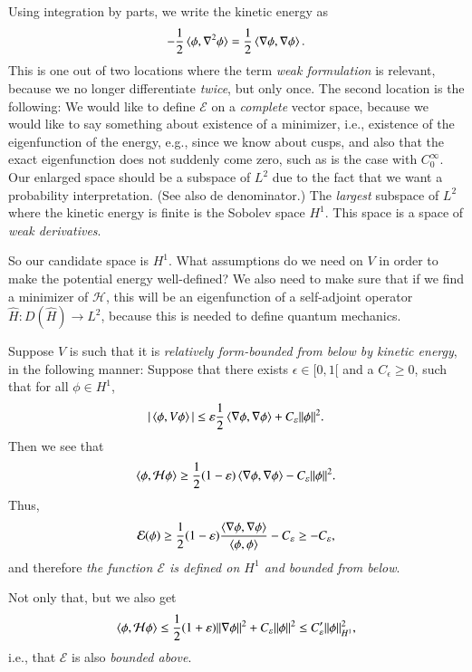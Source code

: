 Using integration by parts, we write the kinetic energy as
\begin{equation}
    -\frac{1}{2}\braket{\phi,\nabla^2\phi} = \frac{1}{2} \braket{\nabla\phi,\nabla\phi}.
\end{equation}
This is one out of two locations where the term \emph{weak formulation} is relevant, because we no longer differentiate \emph{twice}, but only once. The second location is the following: We would like to define $\mathcal{E}$ on a \emph{complete} vector space, because we would like to say something about existence of a minimizer, i.e., existence of the eigenfunction of the energy, e.g., since we know about cusps, and also that the exact eigenfunction does not suddenly come zero, such as is the case with $C^\infty_0$. Our enlarged space should be a subspace of $L^2$ due to the fact that we want a probability interpretation. (See also de denominator.) The \emph{largest} subspace of $L^2$ where the kinetic energy is finite is the Sobolev space $H^1$. This space is a space of \emph{weak derivatives}.

So our candidate space is $H^1$. What assumptions do we need on $V$ in order to make the potential energy well-defined? We also need to make sure that if we find a minimizer of $\mathcal{H}$, this will be an eigenfunction of a self-adjoint operator $\hat{H} : D(\hat{H}) \to L^2$, because this is needed to define quantum mechanics.

Suppose $V$ is such that it is \emph{relatively form-bounded from below by kinetic energy}, in the following manner: Suppose that there exists $\epsilon  \in[0,1[$ and a $C_\epsilon \geq 0$, such that for all $\phi\in H^1$,
\begin{equation} \label{eq:form-bounded}
    |\braket{\phi,V\phi}| \leq \varepsilon \frac{1}{2}\braket{\nabla\phi,\nabla\phi} + C_\varepsilon \|\phi\|^2.
\end{equation}
Then we see that
\begin{equation}
    \braket{\phi,\mathcal{H}\phi} \geq \frac{1}{2}(1-\varepsilon) \braket{\nabla\phi,\nabla\phi} - C_\varepsilon \|\phi\|^2.
\end{equation}
Thus,
\begin{equation}
    \mathcal{E}(\phi) \geq \frac{1}{2}(1-\varepsilon) \frac{\braket{\nabla\phi,\nabla\phi}}{\braket{\phi,\phi}} - C_\varepsilon  \geq - C_\varepsilon,
\end{equation}
and therefore \emph{the function $\mathcal{E}$ is defined on $H^1$ and bounded from below}.

Not only that, but we also get
\begin{equation}
    \braket{\phi,\mathcal{H}\phi} \leq \frac{1}{2}(1 + \varepsilon)\|\nabla\phi\|^2 + C_\varepsilon \|\phi\|^2 \leq C_\varepsilon'\|\phi\|_{H^1}^2,
\end{equation}
i.e., that $\mathcal{E}$ is also \emph{bounded above}.

